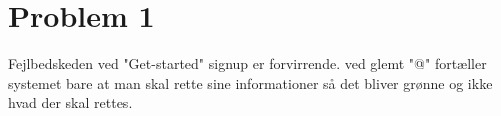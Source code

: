 \documentclass[12pt]{article}
\begin{document}

\clearpage\maketitle
\thispagestyle{empty}

\newpage

\thispagestyle{empty}

\newpage
\pagestyle{plain}
\setcounter{page}{1}



\section*{Problem 1}
Fejlbedskeden ved "Get-started" signup er forvirrende. ved glemt "@" fortæller systemet bare at man skal rette sine informationer så det bliver grønne og ikke hvad der skal rettes.
\newpage
\end{document}
